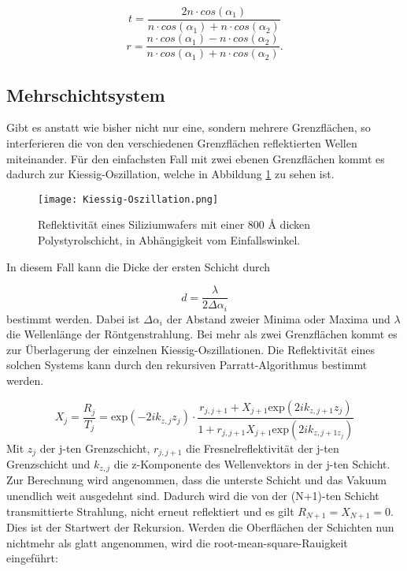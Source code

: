 \begin{equation}
    t = \frac{2 n \cdot cos(\alpha_1)}{n \cdot cos(\alpha_1) + n \cdot cos(\alpha_2)}
\end{equation}
\begin{equation}
    r = \frac{n \cdot cos(\alpha_1) - n \cdot cos(\alpha_2)}{n \cdot cos(\alpha_1) + n \cdot cos(\alpha_2)}.
\end{equation}


\subsection{Mehrschichtsystem}
Gibt es anstatt wie bisher nicht nur eine, sondern mehrere Grenzflächen, so interferieren die von den verschiedenen Grenzflächen reflektierten Wellen miteinander.
Für den einfachsten Fall mit zwei ebenen Grenzflächen kommt es dadurch zur Kiessig-Oszillation, welche in Abbildung \ref{fig:Kiessig-Oszillation} zu sehen ist.

\begin{figure}
    \centering
    \texttt{[image: Kiessig-Oszillation.png]}
    \caption{Reflektivität eines Siliziumwafers mit einer 800 Å dicken Polystyrolschicht, in Abhängigkeit vom Einfallswinkel. \cite{Anleitungalt}}
    \label{fig:Kiessig-Oszillation}
\end{figure}

In diesem Fall kann die Dicke der ersten Schicht durch 

\begin{equation}
    d = \frac{\lambda}{2 \Delta \alpha_i}
\end{equation}
bestimmt werden. Dabei ist $\Delta \alpha_i$ der Abstand zweier Minima oder Maxima und $\lambda$ die Wellenlänge der Röntgenstrahlung.
Bei mehr als zwei Grenzflächen kommt es zur Überlagerung der einzelnen Kiessig-Oszillationen. 
Die Reflektivität eines solchen Systems kann durch den rekursiven Parratt-Algorithmus bestimmt werden.

\begin{equation}
    X_j = \frac{R_j}{T_j} = \text{exp}(-2i k_{z,j} z_j) \cdot \frac{r_{j,j+1} + X_{j+1} \text{exp}(2i k_{z,j+1} z_j) }{1 + r_{j,j+1} X_{j+1} \text{exp}(2i k_{z,j+1 z_j})}
\end{equation}
Mit $z_j$ der j-ten Grenzschicht, $r_{j,j+1}$ die Fresnelreflektivität der j-ten Grenzschicht und $k_{z,j}$ die z-Komponente des Wellenvektors in der j-ten Schicht.
Zur Berechnung wird angenommen, dass die unterste Schicht und das Vakuum unendlich weit ausgedehnt sind. Dadurch wird die von der (N+1)-ten Schicht transmittierte 
Strahlung, nicht erneut reflektiert und es gilt $R_{N+1} = X_{N+1} = 0$.
Dies ist der Startwert der Rekursion.
Werden die Oberflächen der Schichten nun nichtmehr als glatt angenommen, wird die \glqq root-mean-square\grqq{}-Rauigkeit eingeführt:

